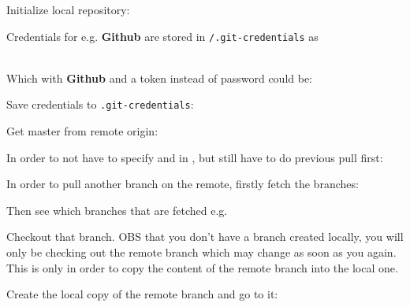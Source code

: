 

Initialize local repository:



Credentials for e.g. \textbf{Github} are stored in \texttt{\textapprox/.git-credentials} as

\\

Which with \textbf{Github} and a token instead of password could be:




Save credentials to \texttt{.git-credentials}:


Get master from remote origin:


In order to not have to specify  and  in , but still have to do previous pull first:



In order to pull another branch on the remote, firstly fetch the branches:


Then see which branches that are fetched e.g.


Checkout that branch. OBS that you don't have a branch created locally, you will only be checking out the remote branch which may change as soon as you  again. This is only in order to copy the content of the remote branch into the local one.


Create the local copy of the remote branch and go to it:

